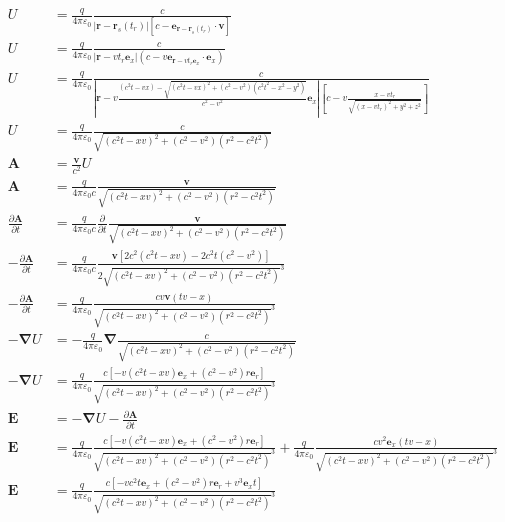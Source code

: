 \begin{align*}
    U&= \frac{q}{4\pi\varepsilon_0} \frac{c}{\vert{}\boldsymbol{r} - \boldsymbol{r}_s(t_r)\vert{}\left[c-\boldsymbol{e}_{\boldsymbol{r} -\boldsymbol{r}_s(t_r)}\cdot\boldsymbol{v}\right]}\\
    U&= \frac{q}{4\pi\varepsilon_0} \frac{c}{\vert{}\boldsymbol{r} - vt_r\boldsymbol{e}_x\vert{}\left(c-v\boldsymbol{e}_{\boldsymbol{r} -vt_r\boldsymbol{e}_x}\cdot\boldsymbol{e}_x\right)}\\
    U&= \frac{q}{4\pi\varepsilon_0} \frac{c}{\left|\boldsymbol{r} - v\frac{(c^2t-vx)- \sqrt{(c^2t-vx)^2+(c^2 - v^2)\left( c^2t^2-x^2- y^2\right) }}{c^2 - v^2}\boldsymbol{e}_x\right|\left[c-v\frac{x-vt_r}{\sqrt{\left(x-vt_r\right)^2+y^2+z^2}}\right]}\\
    U&= \frac{q}{4\pi\varepsilon_0} \frac{c}{\sqrt{(c^2t-xv)^2+(c^2-v^2)(r^2-c^2t^2)}}\\
    \boldsymbol{A}&=\frac{\boldsymbol{v}}{c^2}U\\
    \boldsymbol{A}&=\frac{q}{4\pi\varepsilon_0c} \frac{\boldsymbol{v}}{\sqrt{(c^2t-xv)^2+(c^2-v^2)(r^2-c^2t^2)}}\\
    \frac{\partial \boldsymbol{A}}{\partial t}&=\frac{q}{4\pi\varepsilon_0c} \frac{\partial }{\partial t}\frac{\boldsymbol{v}}{\sqrt{(c^2t-xv)^2+(c^2-v^2)(r^2-c^2t^2)}}\\
    -\frac{\partial \boldsymbol{A}}{\partial t}&=\frac{q}{4\pi\varepsilon_0c}\frac{\boldsymbol{v}[2c^2(c^2t-xv)-2c^2t(c^2-v^2)]}{2\sqrt{(c^2t-xv)^2+(c^2-v^2)(r^2-c^2t^2)}^3}\\
    -\frac{\partial \boldsymbol{A}}{\partial t}&=\frac{q}{4\pi\varepsilon_0}\frac{cv\boldsymbol{v}(tv-x)}{\sqrt{(c^2t-xv)^2+(c^2-v^2)(r^2-c^2t^2)}^3}\\
    -\boldsymbol\nabla U&=- \frac{q}{4\pi\varepsilon_0} \boldsymbol\nabla\frac{c}{\sqrt{(c^2t-xv)^2+(c^2-v^2)(r^2-c^2t^2)}}\\
    -\boldsymbol\nabla U&= \frac{q}{4\pi\varepsilon_0} \frac{c[-v(c^2t-xv)\boldsymbol{e}_x+(c^2-v^2)r\boldsymbol{e}_r]}{\sqrt{(c^2t-xv)^2+(c^2-v^2)(r^2-c^2t^2)}^3}\\
    \boldsymbol{E} &= -\boldsymbol\nabla U - \frac{\partial \boldsymbol{A}}{\partial t}\\
    \boldsymbol{E} &= \frac{q}{4\pi\varepsilon_0} \frac{c[-v(c^2t-xv)\boldsymbol{e}_x+(c^2-v^2)r\boldsymbol{e}_r]}{\sqrt{(c^2t-xv)^2+(c^2-v^2)(r^2-c^2t^2)}^3}
    + \frac{q}{4\pi\varepsilon_0}\frac{cv^2\boldsymbol{e}_x(tv-x)}{\sqrt{(c^2t-xv)^2+(c^2-v^2)(r^2-c^2t^2)}^3}\\
    \boldsymbol{E} &= \frac{q}{4\pi\varepsilon_0} \frac{c[-vc^2t\boldsymbol{e}_x+(c^2-v^2)r\boldsymbol{e}_r+v^3\boldsymbol{e}_xt]}{\sqrt{(c^2t-xv)^2+(c^2-v^2)(r^2-c^2t^2)}^3}
\end{align*}
